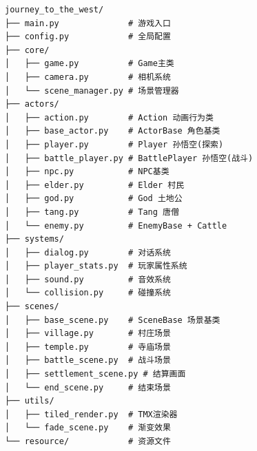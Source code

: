 \documentclass[12pt,a4paper]{article}
\begin{document}
\begin{lstlisting}[language={},caption={项目目录结构}]
journey_to_the_west/
├── main.py              # 游戏入口
├── config.py            # 全局配置
├── core/
│   ├── game.py          # Game主类
│   ├── camera.py        # 相机系统
│   └── scene_manager.py # 场景管理器
├── actors/
│   ├── action.py        # Action 动画行为类
│   ├── base_actor.py    # ActorBase 角色基类
│   ├── player.py        # Player 孙悟空(探索)
│   ├── battle_player.py # BattlePlayer 孙悟空(战斗)
│   ├── npc.py           # NPC基类
│   ├── elder.py         # Elder 村民
│   ├── god.py           # God 土地公
│   ├── tang.py          # Tang 唐僧
│   └── enemy.py         # EnemyBase + Cattle
├── systems/
│   ├── dialog.py        # 对话系统
│   ├── player_stats.py  # 玩家属性系统
│   ├── sound.py         # 音效系统
│   └── collision.py     # 碰撞系统
├── scenes/
│   ├── base_scene.py    # SceneBase 场景基类
│   ├── village.py       # 村庄场景
│   ├── temple.py        # 寺庙场景
│   ├── battle_scene.py  # 战斗场景
│   ├── settlement_scene.py # 结算画面
│   └── end_scene.py     # 结束场景
├── utils/
│   ├── tiled_render.py  # TMX渲染器
│   └── fade_scene.py    # 渐变效果
└── resource/            # 资源文件
\end{lstlisting}
\end{document}
